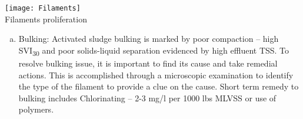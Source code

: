 \begin{itemize}
\begin{enumerate}[1.]
\begin{center}
\texttt{[image: Filaments]}\\
Filaments proliferation
\end{center}

\end{enumerate}
\begin{enumerate}[a.]

\item Bulking:  Activated sludge bulking is marked by poor compaction – high SVI\textsubscript{30} and poor solids-liquid separation evidenced by high effluent TSS.  To resolve bulking issue, it is important to find its cause and take remedial actions.  This is accomplished through a microscopic examination to identify the type of the filament to provide a clue on the cause.  Short term remedy to bulking includes Chlorinating – 2-3 mg/l per 1000 lbs MLVSS or use of polymers.
\pagebreak


\end{enumerate}
\end{itemize}
